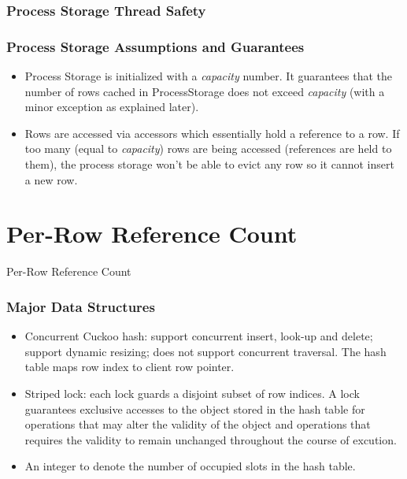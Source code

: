 \documentclass{beamer}
\begin{document}
\begin{frame}
\frametitle{Process Storage Thread Safety}
\end{frame}

\begin{frame}
\frametitle{Process Storage Assumptions and Guarantees}
\begin{itemize}
\item Process Storage is initialized with a \emph{capacity} number. It 
guarantees that the number of rows cached in ProcessStorage does not exceed 
\emph{capacity} (with a minor exception as explained later).

\item Rows are accessed via accessors which essentially hold a reference to
a row. If too many (equal to \emph{capacity}) rows are being accessed 
(references are held to them), the process storage won't be able to evict
any row so it cannot insert a new row.

\end{itemize}
\end{frame}

\section{Per-Row Reference Count}

\begin{frame}
Per-Row Reference Count
\end{frame}

\begin{frame}
\frametitle{Major Data Structures}
\begin{itemize}
\item Concurrent Cuckoo hash: support concurrent insert, look-up and delete; 
support dynamic resizing; does not support concurrent traversal. The hash table
maps row index to client row pointer.
\item Striped lock: each lock guards a disjoint subset of row indices. A lock 
guarantees exclusive accesses to the object stored in the hash table for operations
that may alter the validity of the object and operations that requires the validity 
to remain unchanged throughout the course of excution.
\item An integer to denote the number of occupied slots in the hash table.
\end{itemize}
\end{frame}
\end{document}
